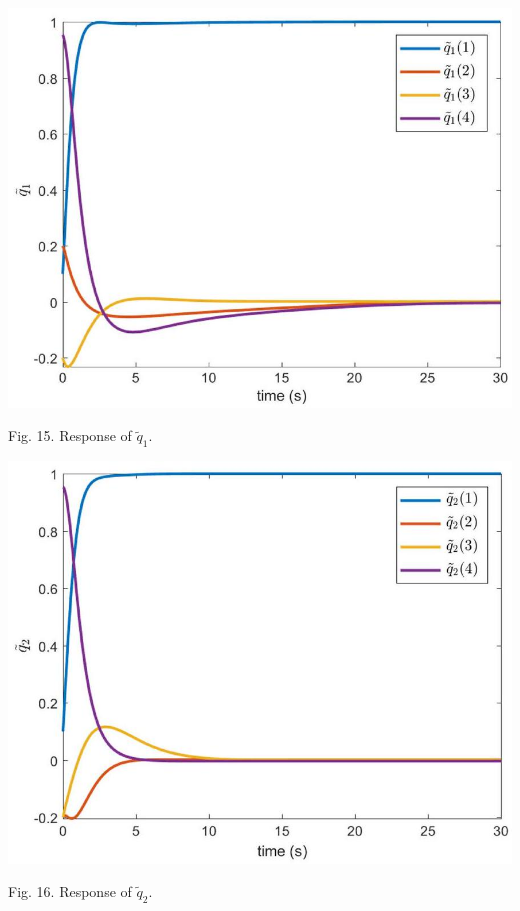 \documentclass[10pt]{article}
\begin{document}
\begin{center}
\includegraphics[max width=\textwidth]{2023_10_07_a50fd94fd281fe9896c1g-09(2)}
\end{center}

Fig. 15. Response of $\tilde{q}_{1}$.

\begin{center}
\includegraphics[max width=\textwidth]{2023_10_07_a50fd94fd281fe9896c1g-09}
\end{center}

Fig. 16. Response of $\tilde{q}_{2}$.
\end{document}
